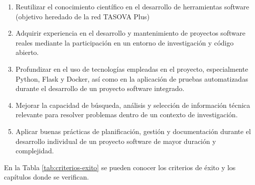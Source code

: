 \begin{enumerate}[resume,label=\textbf{O\arabic*.}]
      \item Reutilizar el conocimiento científico en el desarrollo de herramientas software (objetivo heredado de la red TASOVA Plus)
      \item Adquirir experiencia en el desarrollo y mantenimiento de proyectos software reales mediante la participación en un entorno de investigación y código abierto.
      \item Profundizar en el uso de tecnologías empleadas en el proyecto, especialmente Python, Flask y Docker, así como en la aplicación de pruebas automatizadas durante el desarrollo de un proyecto software integrado.
      \item Mejorar la capacidad de búsqueda, análisis y selección de información técnica relevante para resolver problemas dentro de un contexto de investigación.
      \item Aplicar buenas prácticas de planificación, gestión y documentación durante el desarrollo individual de un proyecto software de mayor duración y complejidad.
      
\end{enumerate}

En la Tabla \ref{tab:criterios-exito} se pueden conocer los criterios de éxito y los capítulos donde se verifican.

